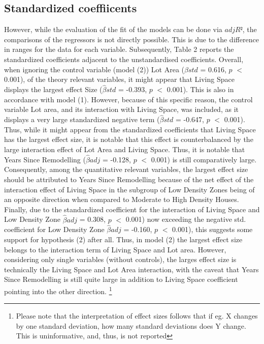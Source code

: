 \documentclass[a4paper]{article}
\begin{document}
\subsection{Standardized coeffiicents}
However, while the evaluation of the fit of the models can be done via $adjR²$, the comparisons of the regressors is not directly possible. This is due to the difference in ranges for the data for each variable. Subsequently, Table 2 reports the standardized coefficients adjacent to the unstandardised coefficients. Overall, when ignoring the control variable (model (2)) Lot Area ($\hat{\beta}std$ = 0.616, $p$ $<$ 0.001), of the theory relevant variables, it might appear that Living Space displays the largest effect Size ($\hat{\beta}std$ = -0.393, $p$ $<$ 0.001). This is also in accordance with model (1). However, because of this specific reason, the control variable Lot area, and its interaction with Living Space, was included, as it displays a very large standardized negative term ($\hat{\beta}std$ = -0.647, $p$ $<$ 0.001). Thus, while it might appear from the standardized coefficients that Living Space has the largest effect size, it is notable that this effect is counterbalanced by the large interaction effect of Lot Area and Living Space. Thus, it is notable that Years Since Remodelling ($\hat{\beta}adj$ = -0.128, $p$ $<$ 0.001) is still comparatively large. Consequently, among the quantitative relevant variables, the largest effect size should be attributed to Years Since Remodelling because of the net effect of the interaction effect of Living Space in the subgroup of Low Density Zones being of an opposite direction when compared to Moderate to High Density Houses. Finally, due to the standardized coefficient for the interaction of Living Space and Low Density Zone $\hat{\beta}adj$ = 0.308, $p$ $<$ 0.001) now exceeding the negative std. coefficient for Low Density Zone $\hat{\beta}adj$ = -0.160, $p$ $<$ 0.001), this suggests some support for hypothesis (2) after all.
\indent Thus, in model (2) the largest effect size belongs to the interaction term of Living Space and Lot area. However, considering only single variables (without controls), the larges effect size is technically the Living Space and Lot Area interaction, with the caveat that Years Since Remodelling is still quite large in addition to Living Space coefficient pointing into the other direction. \footnote{Please note that the interpretation of effect sizes follows that if eg. X changes by one standard deviation, how many standard deviations does Y change. This is uninformative, and, thus, is not reported}
\end{document}
